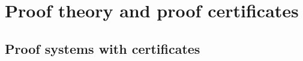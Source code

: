 
\newpage
\section{Proof theory and proof certificates}
\label{sec:three}
  \newcommand{\XXi}{{\color{blue}{\Xi}}}


\subsection{Proof systems with certificates}
\label{ssec:focused}




